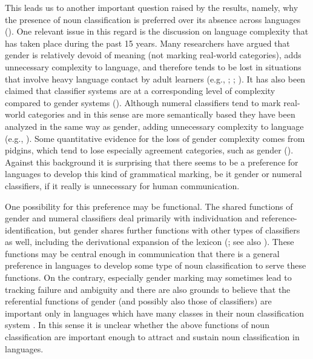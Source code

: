 \documentclass[output=collectionpaper]{langsci/langscibook}
\begin{document}
This leads us to another important question raised by the results, namely, why the presence of noun classification is preferred over its absence across languages (). One relevant issue in this regard is the discussion on language complexity that has taken place during the past 15 years. Many researchers have argued that gender is relatively devoid of meaning (not marking real-world categories), adds unnecessary complexity to language, and therefore tends to be lost in situations that involve heavy language contact by adult learners (e.g., \citealt[129]{McWhorter2001}; \citealt[25]{Kusters2003}; \citealt[155--166]{Trudgill2011}). It has also been claimed that classifier systems are at a corresponding level of complexity compared to gender systems (\citealt[136--141, 147--148]{Riddle2008}). Although numeral classifiers tend to mark real-world categories \textendash{} and in this sense are more semantically based \textendash{} they have been analyzed in the same way as gender, adding unnecessary complexity to language (e.g., \citealt[22]{McWhorter2007}). Some quantitative evidence for the loss of gender complexity comes from pidgins, which tend to lose especially agreement categories, such as gender (\citealt{Roberts2008}). Against this background it is surprising that there seems to be a preference for languages to develop this kind of grammatical marking, be it gender or numeral classifiers, if it really is unnecessary for human communication.

One possibility for this preference may be functional. The shared functions of gender and numeral classifiers deal primarily with individuation and reference-identification, but gender shares further functions with other types of classifiers as well, including the derivational expansion of the lexicon (\citealt{Contini-Morava2013}; see also \citealt[136--141]{Riddle2008}). These functions may be central enough in communication that there is a general preference in languages to develop some type of noun classification to serve these functions. On the contrary, especially gender marking may sometimes lead to tracking failure and ambiguity and there are also grounds to believe that the referential functions of gender (and possibly also those of classifiers) are important only in languages which have many classes in their noun classification system \citep[158--159]{Trudgill2011}. In this sense it is unclear whether the above functions of noun classification are important enough to attract and sustain noun classification in languages.
\end{document}
